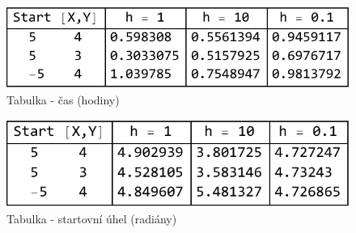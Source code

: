 \documentclass[reqno, a4paper]{amsart}
\numberwithin{equation}{section}
\begin{document}
\begin{figure}
\includegraphics[scale=0.7]{figures/Kvad - tab. čas.pdf}
\caption{Tabulka - čas (hodiny)}
\label{TabY1}
\end{figure}
\begin{figure}
\includegraphics[scale=0.7]{figures/Kvad - tab. beta.pdf}
\caption{Tabulka - startovní úhel (radiány)}
\label{TabY2}
\end{figure}



























\end{document}
